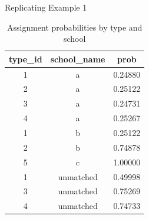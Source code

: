 \documentclass[notes,11pt, aspectratio=169]{beamer}
\begin{document}
\begin{frame}{Replicating Example 1}
    \begin{table}[htbp]
\centering
\begin{tabular}{ccc}
\hline
\textbf{type\_id} & \textbf{school\_name} & \textbf{prob} \\
\hline
1 & a         & 0.24880 \\
2 & a         & 0.25122 \\
3 & a         & 0.24731 \\
4 & a         & 0.25267 \\
1 & b         & 0.25122 \\
2 & b         & 0.74878 \\
5 & c         & 1.00000 \\
1 & unmatched & 0.49998 \\
3 & unmatched & 0.75269 \\
4 & unmatched & 0.74733 \\
\hline
\end{tabular}
\caption{Assignment probabilities by type and school}
\label{tab:type_probs}
\end{table}
\end{frame}
\end{document}
